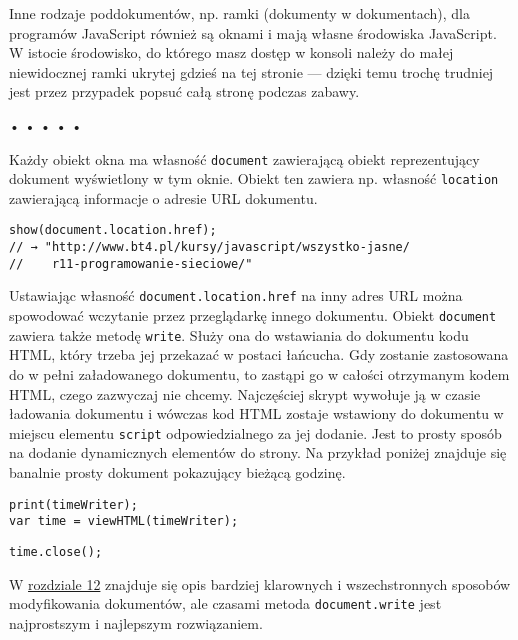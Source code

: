 Inne rodzaje poddokumentów, np. ramki (dokumenty w dokumentach), dla programów JavaScript również są oknami i mają własne środowiska JavaScript. W istocie środowisko, do którego masz dostęp w konsoli należy do małej niewidocznej ramki ukrytej gdzieś na tej stronie — dzięki temu trochę trudniej jest przez przypadek popsuć całą stronę podczas zabawy.



\begin{center}
• • • • •
\end{center}

  
Każdy obiekt okna ma własność \texttt{document} zawierającą obiekt reprezentujący dokument wyświetlony w tym oknie. Obiekt ten zawiera np. własność \texttt{location} zawierającą informacje o adresie URL dokumentu.

  
\begin{verbatim} 
show(document.location.href);
// → "http://www.bt4.pl/kursy/javascript/wszystko-jasne/
//    r11-programowanie-sieciowe/"
\end{verbatim}
  
Ustawiając własność \texttt{document.location.href} na inny adres URL można spowodować wczytanie przez przeglądarkę innego dokumentu. Obiekt \texttt{document} zawiera także metodę \texttt{write}. Służy ona do wstawiania do dokumentu kodu HTML, który trzeba jej przekazać w postaci łańcucha. Gdy zostanie zastosowana do w pełni załadowanego dokumentu, to zastąpi go w całości otrzymanym kodem HTML, czego zazwyczaj nie chcemy. Najczęściej skrypt wywołuje ją w czasie ładowania dokumentu i wówczas kod HTML zostaje wstawiony do dokumentu w miejscu elementu \texttt{script} odpowiedzialnego za jej dodanie. Jest to prosty sposób na dodanie dynamicznych elementów do strony. Na przykład poniżej znajduje się banalnie prosty dokument pokazujący bieżącą godzinę.

  
\begin{verbatim} 
print(timeWriter);
var time = viewHTML(timeWriter);
 \end{verbatim}
  
\begin{verbatim} 
time.close();
 \end{verbatim}
  
W \hyperref[chap:12]{rozdziale 12} znajduje się opis bardziej klarownych i wszechstronnych sposobów modyfikowania dokumentów, ale czasami metoda \texttt{document.write} jest najprostszym i najlepszym rozwiązaniem.



